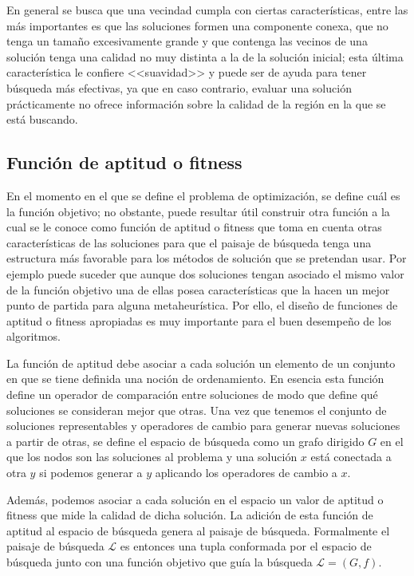 En general se busca que una vecindad cumpla con ciertas características, entre las más importantes es que las soluciones formen una componente conexa, 
que no tenga un tamaño excesivamente grande y que contenga las vecinos de una solución tenga una calidad no muy distinta a la de la solución inicial;
esta última característica le confiere <<suavidad>> y puede ser de ayuda para tener búsqueda más efectivas, ya que en caso contrario, evaluar una
solución prácticamente no ofrece información sobre la calidad de la región en la que se está buscando.

\subsection{Funci\'on de aptitud o fitness}
En el momento en el que se define el problema de optimización, se define cuál es la función objetivo; 
no obstante, puede resultar útil construir otra función a la cual se le conoce como función de aptitud o fitness que toma en cuenta otras características 
de las soluciones para que el paisaje de búsqueda tenga una estructura más favorable para los métodos de solución que se pretendan usar. 
%
Por ejemplo puede suceder que aunque dos soluciones tengan asociado el mismo valor de la función objetivo una de ellas posea características que la hacen 
un mejor punto de partida para alguna metaheurística.
%
Por ello, el diseño de funciones de aptitud o fitness apropiadas es muy importante para el buen desempeño de los algoritmos.

La función de aptitud debe asociar a cada solución un elemento de un conjunto en que se tiene definida una noción de ordenamiento. 
%
En esencia esta función define un operador de comparación entre soluciones de modo que define qué soluciones se consideran mejor que otras.
%
Una vez que tenemos el conjunto de soluciones representables y operadores de cambio para generar nuevas soluciones a partir de otras, se define 
el espacio de búsqueda como un grafo dirigido $G$ en el que los nodos son las soluciones al problema y una solución $x$ está conectada a otra $y$ 
si podemos generar a $y$ aplicando los operadores de cambio a $x$.

Además, podemos asociar a cada solución en el espacio un valor de aptitud o fitness que mide la calidad de dicha solución. 
%
La adición de esta función de aptitud al espacio de búsqueda genera al paisaje de búsqueda. 
%
Formalmente el paisaje de búsqueda $\mathcal{L}$ es entonces una tupla conformada por el espacio de búsqueda junto con una función objetivo que 
guía la búsqueda $\mathcal{L}=(G,f)$.

